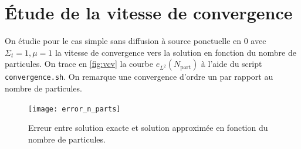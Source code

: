 \documentclass[11pt,a4paper]{article}
\begin{document}
\section{Étude de la vitesse de convergence}

On étudie pour le cas simple sans diffusion à source ponctuelle en $0$ avec $\Sigma_t=1, \mu=1$ la vitesse de convergence vers la solution en fonction du nombre de particules. On trace en \autoref{fig:vcv} la courbe $e_{L^2}(N_{\text{part}})$ à l'aide du script \texttt{convergence.sh}. On remarque une convergence d'ordre un par rapport au nombre de particules.   

\begin{figure}
  \centering
  \texttt{[image: error\_n\_parts]}
  \caption{Erreur entre solution exacte et solution approximée en fonction du nombre de particules.}
  \label{fig:vcv}
\end{figure}
\end{document}
